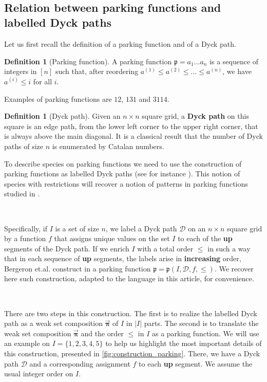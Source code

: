 \documentclass[12pt, reqno]{amsart}
\theoremstyle{definition}
\newtheorem{defin}[thm]{Definition}
\newcommand{\opi}{\vec{\boldsymbol{\pi}}}
\begin{document}
\

\subsection{Relation between parking functions and labelled Dyck paths}

Let us first recall the definition of a parking function and of a Dyck path.

\begin{defin}[Parking function]
A parking function $\mathfrak{p} = a_1 \dots a_n$ is a sequence of integers in $[n]$ such that, after reordering $a^{(1)} \leq a^{(2)} \leq \dots \leq a^{(n)}$, we have $a^{(i)} \leq i$ for all $i$.
\end{defin}

Examples of parking functions are $12$, $131$ and $3114$.

\begin{defin}[Dyck path]
Given an $n\times n$ square grid, a \textbf{Dyck path} on this square is an edge path, from the lower left corner to the upper right corner, that is always above the main diagonal.
It is a classical result that the number of Dyck paths of size $n$ is enumerated by Catalan numbers.
\end{defin}


To describe species on parking functions we need to use the construction of parking functions as labelled Dyck paths (see for instance \cite{Loehr}).
This notion of species with restrictions will recover a notion of patterns in parking functions studied in \cite{adeniran2022pattern}.

\

Specifically, if $I$ is a set of size $n$, we label a Dyck path $\mathcal D$ on an $n\times n$ square grid by a function $f$ that assigns unique values on the set $I$ to each of the \textbf{up} segments of the Dyck path.
If we enrich $I$ with a total order $\leq$ in such a way that in each sequence of \textbf{up} segments, the labels arise in \textbf{increasing} order, Bergeron et.al. construct in \cite{BGLPV2021} a parking function $\mathfrak{p} = \mathfrak{p}(I, \mathcal D, f, \leq) $.
We recover here such construction, adapted to the language in this article, for convenience.

\

There are two steps in this construction.
The first is to realize the labelled Dyck path as a weak set composition $\opi$ of $I$ in $|I|$ parts. The second is to translate the weak set composition $\opi$ and the order $\leq $ in $I$ as a parking function.
We will use an example on $I = \{1, 2, 3, 4, 5\}$ to help us highlight the most important details of this construction, presented in \cref{fig:construction_parking}.
There, we have a Dyck path $\mathcal D$ and a corresponding assignment $f$ to each \textbf{up} segment.
We assume the usual integer order on $I$.
\end{document}
